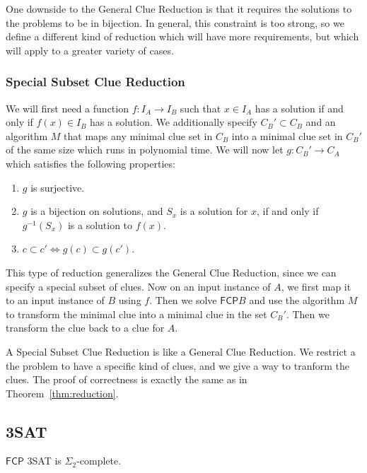 \documentclass[runningheads,a4paper]{llncs}
\begin{document}
One downside to the General Clue Reduction is that it requires the solutions to the problems to be in bijection. In general, this constraint is too strong, so we define a different kind of reduction which will have more requirements, but which will apply to a greater variety of cases.

\subsubsection{Special Subset Clue Reduction} We will first need a function $f: I_A \rightarrow I_B$ such that $x \in I_A$ has a solution if and only if $f(x) \in I_B$ has a solution. We additionally specify $C_B' \subset C_B$ and an algorithm $M$ that maps any minimal clue set in $C_B$ into a minimal clue set in $C_B'$ of the same size which runs in polynomial time. We will now let $g: C_B' \rightarrow C_A$ which satisfies the following properties:
\begin{enumerate}
\item $g$ is surjective.
\item $g$ is a bijection on solutions, and $S_x$ is a solution for $x$, if and only if $g^{-1}(S_x)$ is a solution to $f(x)$. 
\item $c \subset c' \iff g(c) \subset g(c')$. 
\end{enumerate} 
This type of reduction generalizes the General Clue Reduction, since we can specify a special subset of clues. Now on an input instance of $A$, we first map it to an input instance of $B$ using $f$. Then we solve $\mathsf{FCP} B$ and use the algorithm $M$ to transform the minimal clue into a minimal clue in the set $C_B'$. Then we transform the clue back to a clue for $A$. 

A Special Subset Clue Reduction is like a General Clue Reduction. We restrict a the problem to have a specific kind of clues, and we give a way to tranform the clues. The proof of correctness is exactly the same as in Theorem~\ref{thm:reduction}. 

\subsection{3SAT}

\begin{theorem}
$\mathsf{FCP}$ 3SAT is $\Sigma_2$-complete. 
\end{theorem} 
\end{document}
